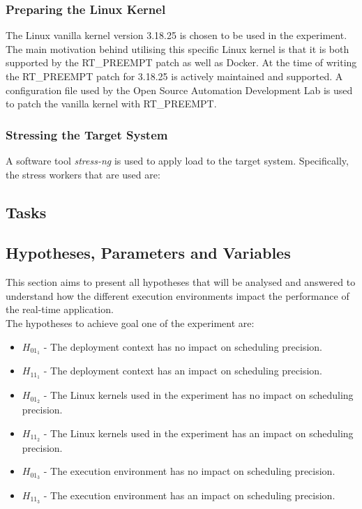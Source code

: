 \subsubsection{Preparing the Linux Kernel}
The Linux vanilla kernel version 3.18.25 is chosen to be used in the experiment. The main motivation behind utilising this specific Linux kernel is that it is both supported by the RT\_PREEMPT patch as well as Docker. At the time of writing the RT\_PREEMPT patch for 3.18.25 is actively maintained and supported. A configuration file used by the Open Source Automation Development Lab \cite{OSADL} is used to patch the vanilla kernel with RT\_PREEMPT.

\subsubsection{Stressing the Target System}
A software tool \textit{stress-ng} is used to apply load to the target system. Specifically, the stress workers that are used are:  



\subsection{Tasks}


\subsection{Hypotheses, Parameters and Variables}
This section aims to present all hypotheses that will be analysed and answered to understand how the different execution environments impact the performance of the real-time application.\\

The hypotheses to achieve goal one of the experiment are:
\begin{itemize}
\item $H_{01_{1}}$ - The deployment context has no impact on scheduling precision.
\item $H_{11_{1}}$ - The deployment context has an impact on scheduling precision.
\item $H_{01_{2}}$ - The Linux kernels used in the experiment has no impact on scheduling precision.
\item $H_{11_{2}}$ - The Linux kernels used in the experiment has an impact on scheduling precision.
\item $H_{01_{3}}$ - The execution environment has no impact on scheduling precision.
\item $H_{11_{3}}$ - The execution environment has an impact on scheduling precision.\\
\end{itemize}



